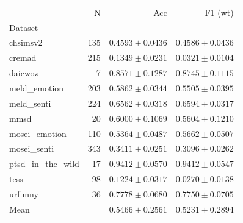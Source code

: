 \begin{tabular}{lrrr}
\toprule
 & N & Acc & F1 (wt) \\
Dataset &  &  &  \\
\midrule
chsimsv2 & 135 & $0.4593 \pm 0.0436$ & $0.4586 \pm 0.0436$ \\
cremad & 215 & $0.1349 \pm 0.0231$ & $0.0321 \pm 0.0104$ \\
daicwoz & 7 & $0.8571 \pm 0.1287$ & $0.8745 \pm 0.1115$ \\
meld_emotion & 203 & $0.5862 \pm 0.0344$ & $0.5505 \pm 0.0395$ \\
meld_senti & 224 & $0.6562 \pm 0.0318$ & $0.6594 \pm 0.0317$ \\
mmsd & 20 & $0.6000 \pm 0.1069$ & $0.5604 \pm 0.1210$ \\
mosei_emotion & 110 & $0.5364 \pm 0.0487$ & $0.5662 \pm 0.0507$ \\
mosei_senti & 343 & $0.3411 \pm 0.0251$ & $0.3096 \pm 0.0262$ \\
ptsd_in_the_wild & 17 & $0.9412 \pm 0.0570$ & $0.9412 \pm 0.0547$ \\
tess & 98 & $0.1224 \pm 0.0317$ & $0.0270 \pm 0.0138$ \\
urfunny & 36 & $0.7778 \pm 0.0680$ & $0.7750 \pm 0.0705$ \\
Mean &  & $0.5466 \pm 0.2561$ & $0.5231 \pm 0.2894$ \\
\bottomrule
\end{tabular}
